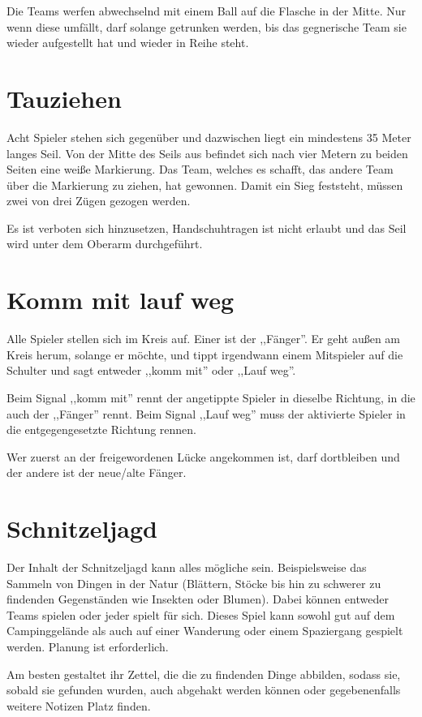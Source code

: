 \documentclass[a4paper]{report}
\begin{document}
Die Teams werfen abwechselnd mit einem Ball auf die Flasche in der Mitte. Nur wenn diese umfällt, darf solange getrunken werden, bis das gegnerische Team sie wieder aufgestellt hat und wieder in Reihe steht.

\section*{Tauziehen}
Acht Spieler stehen sich gegenüber und dazwischen liegt ein mindestens 35 Meter langes Seil. Von der Mitte des Seils aus befindet sich nach vier Metern zu beiden Seiten eine weiße Markierung. Das Team, welches es schafft, das andere Team über die Markierung zu ziehen, hat gewonnen. Damit ein Sieg feststeht, müssen zwei von drei Zügen gezogen werden.

Es ist verboten sich hinzusetzen, Handschuhtragen ist nicht erlaubt und das Seil wird unter dem Oberarm durchgeführt.

\section*{Komm mit lauf weg}
Alle Spieler stellen sich im Kreis auf. Einer ist der ,,Fänger''. Er geht außen am Kreis herum, solange er möchte, und tippt irgendwann einem Mitspieler auf die Schulter und sagt entweder ,,komm mit'' oder ,,Lauf weg''.

Beim Signal ,,komm mit'' rennt der angetippte Spieler in dieselbe Richtung, in die auch der ,,Fänger'' rennt.
Beim Signal ,,Lauf weg'' muss der aktivierte Spieler in die entgegengesetzte Richtung rennen.

Wer zuerst an der freigewordenen Lücke angekommen ist, darf dortbleiben und der andere ist der neue/alte Fänger.

\section*{Schnitzeljagd}
Der Inhalt der Schnitzeljagd kann alles mögliche sein. Beispielsweise das Sammeln von Dingen in der Natur (Blättern, Stöcke bis hin zu schwerer zu findenden Gegenständen wie Insekten oder Blumen). Dabei können entweder Teams spielen oder jeder spielt für sich. Dieses Spiel kann sowohl gut auf dem Campinggelände als auch auf einer Wanderung oder einem Spaziergang gespielt werden. Planung ist erforderlich.

Am besten gestaltet ihr Zettel, die die zu findenden Dinge abbilden, sodass sie, sobald sie gefunden wurden, auch abgehakt werden können oder gegebenenfalls weitere Notizen Platz finden.
\end{document}
